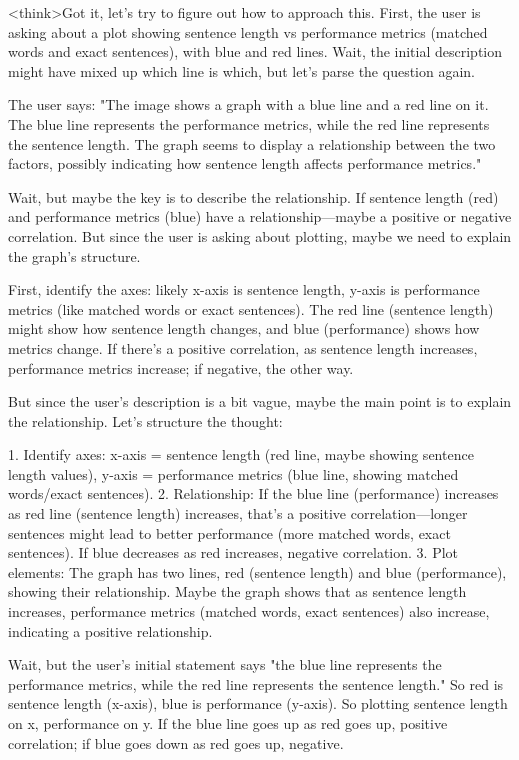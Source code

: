 <think>Got it, let's try to figure out how to approach this. First, the user is asking about a plot showing sentence length vs performance metrics (matched words and exact sentences), with blue and red lines. Wait, the initial description might have mixed up which line is which, but let's parse the question again.

The user says: "The image shows a graph with a blue line and a red line on it. The blue line represents the performance metrics, while the red line represents the sentence length. The graph seems to display a relationship between the two factors, possibly indicating how sentence length affects performance metrics."

Wait, but maybe the key is to describe the relationship. If sentence length (red) and performance metrics (blue) have a relationship—maybe a positive or negative correlation. But since the user is asking about plotting, maybe we need to explain the graph's structure.

First, identify the axes: likely x-axis is sentence length, y-axis is performance metrics (like matched words or exact sentences). The red line (sentence length) might show how sentence length changes, and blue (performance) shows how metrics change. If there's a positive correlation, as sentence length increases, performance metrics increase; if negative, the other way.

But since the user's description is a bit vague, maybe the main point is to explain the relationship. Let's structure the thought:

1. Identify axes: x-axis = sentence length (red line, maybe showing sentence length values), y-axis = performance metrics (blue line, showing matched words/exact sentences).
2. Relationship: If the blue line (performance) increases as red line (sentence length) increases, that's a positive correlation—longer sentences might lead to better performance (more matched words, exact sentences). If blue decreases as red increases, negative correlation.
3. Plot elements: The graph has two lines, red (sentence length) and blue (performance), showing their relationship. Maybe the graph shows that as sentence length increases, performance metrics (matched words, exact sentences) also increase, indicating a positive relationship.

Wait, but the user's initial statement says "the blue line represents the performance metrics, while the red line represents the sentence length." So red is sentence length (x-axis), blue is performance (y-axis). So plotting sentence length on x, performance on y. If the blue line goes up as red goes up, positive correlation; if blue goes down as red goes up, negative.

